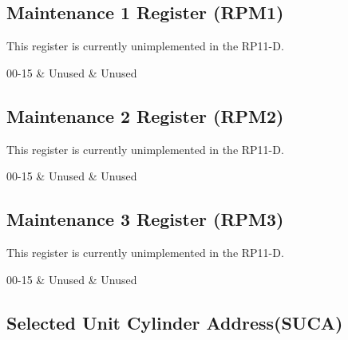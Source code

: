 \subsection{Maintenance 1 Register (RPM1)}

\begin{register16}
\end{register16}

This register is currently unimplemented in the RP11-D.

\begin{bittable}
  00-15 & Unused & Unused \\
\end{bittable}

\subsection{Maintenance 2 Register (RPM2)}

This register is currently unimplemented in the RP11-D.

\begin{register16}
\end{register16}

\begin{bittable}
  00-15 & Unused & Unused \\
\end{bittable}

\subsection{Maintenance 3 Register (RPM3)}

This register is currently unimplemented in the RP11-D.

\begin{register16}
\end{register16}

\begin{bittable}
  00-15 & Unused & Unused \\
\end{bittable}

\subsection{Selected Unit Cylinder Address(SUCA)}

\begin{register16}
\end{register16}

